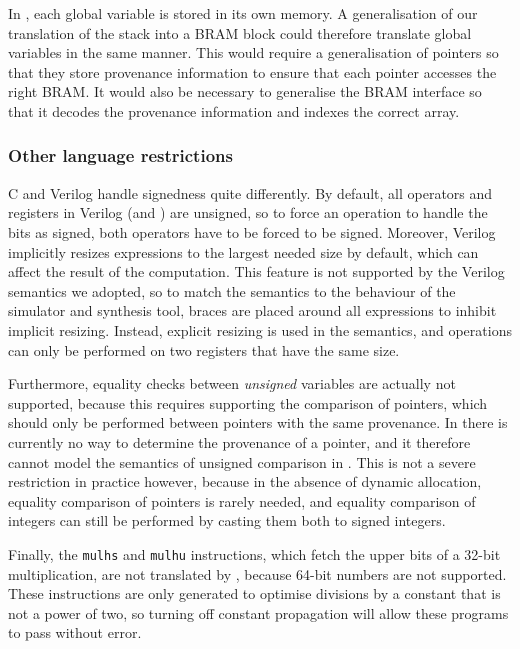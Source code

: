 In \compcert{}, each global variable is stored in its own memory.  A
generalisation of our translation of the stack into a \gls{BRAM} block could
therefore translate global variables in the same manner.  This would require a
generalisation of pointers so that they store provenance information to ensure
that each pointer accesses the right \gls{BRAM}. It would also be necessary to
generalise the \gls{BRAM} interface so that it decodes the provenance
information and indexes the correct array.

\subsubsection{Other language restrictions}

C and Verilog handle signedness quite differently. By default, all operators and
registers in Verilog (and \htl{}) are unsigned, so to force an operation to
handle the bits as signed, both operators have to be forced to be
signed. Moreover, Verilog implicitly resizes expressions to the largest needed
size by default, which can affect the result of the computation.  This feature
is not supported by the Verilog semantics we adopted, so to match the semantics
to the behaviour of the simulator and synthesis tool, braces are placed around
all expressions to inhibit implicit resizing.  Instead, explicit resizing is
used in the semantics, and operations can only be performed on two registers
that have the same size.

Furthermore, equality checks between \emph{unsigned} variables are actually not
supported, because this requires supporting the comparison of pointers, which
should only be performed between pointers with the same provenance.  In
\vericert{} there is currently no way to determine the provenance of a pointer,
and it therefore cannot model the semantics of unsigned comparison in
\compcert{}. This is not a severe restriction in practice however, because in
the absence of dynamic allocation, equality comparison of pointers is rarely
needed, and equality comparison of integers can still be performed by casting
them both to signed integers.

Finally, the \texttt{mulhs} and \texttt{mulhu} instructions, which fetch the
upper bits of a 32-bit multiplication, are not translated by \vericert{},
because 64-bit numbers are not supported. These instructions are only generated
to optimise divisions by a constant that is not a power of two, so turning off
constant propagation will allow these programs to pass without error.

